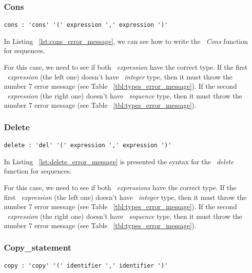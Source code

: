 \documentclass[
  oneside,
  11pt, a4paper,
  footinclude=true,
  headinclude=true,
  cleardoublepage=empty
]{scrbook}
\begin{document}
\subsubsection{Cons}

\begin{lstlisting}[caption={Cons rule in LISS},label={lst:cons_error_message}]
  cons : 'cons' '(' expression ',' expression ')'
\end{lstlisting}

In Listing ~\ref{lst:cons_error_message}, we can see how to write the ~\textit{Cons} function for sequences.

For this case, we need to see if both ~\textit{expression} have the correct type.
If the first ~\textit{expression} (the left one) doesn't have ~\textit{integer} type, then it must throw the number 7 error message (see Table ~\ref{tbl:types_error_message}).
If the second ~\textit{expression} (the right one) doesn't have ~\textit{sequence} type, then it must throw the number 7 error message (see Table ~\ref{tbl:types_error_message}).

\subsubsection{Delete}

\begin{lstlisting}[caption={Delete rule in LISS},label={lst:delete_error_message}]
  delete : 'del' '(' expression ',' expression ')'
\end{lstlisting}

In Listing ~\ref{lst:delete_error_message} is presented the syntax for the ~\textit{delete} function for sequences.

For this case, we need to see if both ~\textit{expressions} have the correct type.
If the first ~\textit{expression} (the left one) doesn't have ~\textit{integer} type, then it must throw the number 7 error message (see Table ~\ref{tbl:types_error_message}).
If the second ~\textit{expression} (the right one) doesn't have ~\textit{sequence} type, then it must throw the number 7 error message (see Table ~\ref{tbl:types_error_message}).

\subsubsection{Copy\_statement}

\begin{lstlisting}[caption={Copy\_statement rule in LISS},label={lst:copy_statement_error_message}]
  copy : 'copy' '(' identifier ',' identifier ')'
\end{lstlisting}
\end{document}
